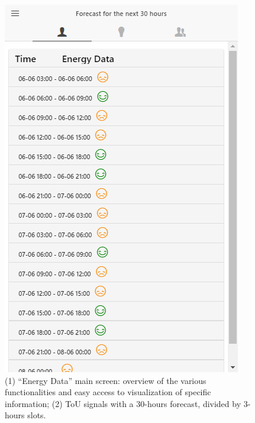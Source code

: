 \begin{figure}
\begin{center}
\begin{minipage}[htb]{0.45\linewidth}
         \includegraphics[width=1\linewidth]{img/touprediction.png}   
        \end{minipage}
      \end{center}
      \caption{(1) ``Energy Data'' main screen: overview of the various functionalities and easy access to visualization of specific information;
(2) ToU signals with a 30-hours forecast, divided by 3-hours slots.}\label{fig:overview-tou}
\end{figure}

